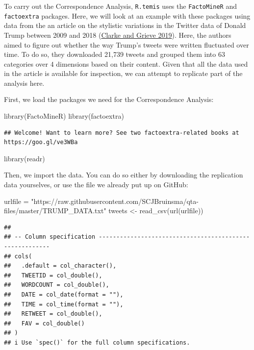 \documentclass[
]{book}
\newenvironment{Shaded}{\begin{snugshade}}{\end{snugshade}}
\newcommand{\FunctionTok}[1]{\textcolor[rgb]{0.00,0.00,0.00}{#1}}
\newcommand{\NormalTok}[1]{#1}
\newcommand{\OtherTok}[1]{\textcolor[rgb]{0.56,0.35,0.01}{#1}}
\newcommand{\StringTok}[1]{\textcolor[rgb]{0.31,0.60,0.02}{#1}}
\begin{document}
To carry out the Correspondence Analysis, \texttt{R.temis} uses the \texttt{FactoMineR} and \texttt{factoextra} packages. Here, we will look at an example with these packages using data from the an article on the stylistic variations in the Twitter data of Donald Trump between 2009 and 2018 (\protect\hyperlink{ref-Clarke2019a}{Clarke and Grieve 2019}). Here, the authors aimed to figure out whether the way Trump's tweets were written fluctuated over time. To do so, they downloaded 21,739 tweets and grouped them into 63 categories over 4 dimensions based on their content. Given that all the data used in the article is available for inspection, we can attempt to replicate part of the analysis here.

First, we load the packages we need for the Correspondence Analysis:

\begin{Shaded}
\begin{Highlighting}[]
\FunctionTok{library}\NormalTok{(FactoMineR)}
\FunctionTok{library}\NormalTok{(factoextra)}
\end{Highlighting}
\end{Shaded}

\begin{verbatim}
## Welcome! Want to learn more? See two factoextra-related books at https://goo.gl/ve3WBa
\end{verbatim}

\begin{Shaded}
\begin{Highlighting}[]
\FunctionTok{library}\NormalTok{(readr)}
\end{Highlighting}
\end{Shaded}

Then, we import the data. You can do so either by downloading the replication data yourselves, or use the file we already put up on GitHub:

\begin{Shaded}
\begin{Highlighting}[]
\NormalTok{urlfile }\OtherTok{=} \StringTok{"https://raw.githubusercontent.com/SCJBruinsma/qta{-}files/master/TRUMP\_DATA.txt"}
\NormalTok{tweets }\OtherTok{\textless{}{-}} \FunctionTok{read\_csv}\NormalTok{(}\FunctionTok{url}\NormalTok{(urlfile))}
\end{Highlighting}
\end{Shaded}

\begin{verbatim}
## 
## -- Column specification --------------------------------------------------------
## cols(
##   .default = col_character(),
##   TWEETID = col_double(),
##   WORDCOUNT = col_double(),
##   DATE = col_date(format = ""),
##   TIME = col_time(format = ""),
##   RETWEET = col_double(),
##   FAV = col_double()
## )
## i Use `spec()` for the full column specifications.
\end{verbatim}
\end{document}
